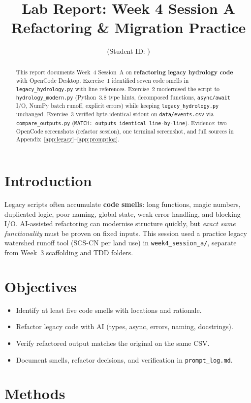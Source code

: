 \documentclass[11pt,a4paper]{article}
\title{Lab Report: Week 4 Session A\\Refactoring \& Migration Practice}
\author{\studentname \quad (Student ID: \studentid)}
\date{\reportdate}
\begin{document}
\maketitle

\begin{abstract}
This report documents Week~4 Session~A on \textbf{refactoring legacy hydrology code} with OpenCode Desktop. Exercise~1 identified seven code smells in \texttt{legacy\_hydrology.py} with line references. Exercise~2 modernised the script to \texttt{hydrology\_modern.py} (Python~3.8 type hints, decomposed functions, \texttt{async/await} I/O, NumPy batch runoff, explicit errors) while keeping \texttt{legacy\_hydrology.py} unchanged. Exercise~3 verified byte-identical stdout on \texttt{data/events.csv} via \texttt{compare\_outputs.py} (\texttt{MATCH: outputs identical line-by-line}). Evidence: two OpenCode screenshots (refactor session), one terminal screenshot, and full sources in Appendix~\ref{app:legacy}--\ref{app:promptlog}.
\end{abstract}

\section{Introduction}
Legacy scripts often accumulate \textbf{code smells}: long functions, magic numbers, duplicated logic, poor naming, global state, weak error handling, and blocking I/O. AI-assisted refactoring can modernise structure quickly, but \emph{exact same functionality} must be proven on fixed inputs. This session used a practice legacy watershed runoff tool (SCS-CN per land use) in \texttt{week4\_session\_a/}, separate from Week~3 scaffolding and TDD folders.

\section{Objectives}
\begin{itemize}[noitemsep]
  \item Identify at least five code smells with locations and rationale.
  \item Refactor legacy code with AI (types, async, errors, naming, docstrings).
  \item Verify refactored output matches the original on the same CSV.
  \item Document smells, refactor decisions, and verification in \texttt{prompt\_log.md}.
\end{itemize}

\section{Methods}
\end{document}
